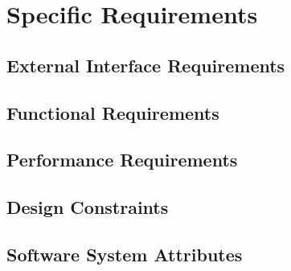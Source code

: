 \chapter{Specific Requirements}

\section{External Interface Requirements}

\section{Functional Requirements}

\section{Performance Requirements}

\section{Design Constraints}

\section{Software System Attributes}